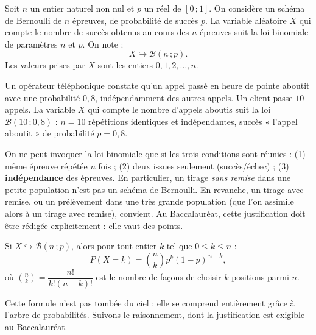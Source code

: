 \documentclass[11pt]{article}
\newcommand{\cle}[1]{{\popxbold\color{popdark}#1}}
\newcounter{popsec}
\newcounter{popsub}
\newcommand{\courssub}[1]{%
  \stepcounter{popsub}%
  \par\vspace{9pt}\noindent{\popxbold\fontsize{11.5}{13}\selectfont\color{popink}{\color{poporange}\thepopsec.\thepopsub}\hspace{6pt}#1}\par\nopagebreak\vspace{4pt}
}
\begin{document}
\begin{definition}
Soit $n$ un entier naturel non nul et $p$ un réel de $[0\,;1]$. On considère un schéma de Bernoulli de $n$ épreuves, de probabilité de succès $p$. La variable aléatoire $X$ qui compte le \cle{nombre de succès} obtenus au cours des $n$ épreuves suit la \cle{loi binomiale} de paramètres $n$ et $p$. On note :
\[ X \hookrightarrow \mathcal{B}(n\,;p). \]
Les valeurs prises par $X$ sont les entiers $0, 1, 2, \dots, n$.
\end{definition}

\begin{exemplebox}
Un opérateur téléphonique constate qu'un appel passé en heure de pointe aboutit avec une probabilité $0{,}8$, indépendamment des autres appels. Un client passe $10$ appels. La variable $X$ qui compte le nombre d'appels aboutis suit la loi $\mathcal{B}(10\,;0{,}8)$ : $n = 10$ répétitions identiques et indépendantes, succès « l'appel aboutit » de probabilité $p = 0{,}8$.
\end{exemplebox}

\begin{attention}
On ne peut invoquer la loi binomiale que si les trois conditions sont réunies : (1) même épreuve répétée $n$ fois ; (2) deux issues seulement (succès/échec) ; (3) \textbf{indépendance} des épreuves. En particulier, un tirage \emph{sans remise} dans une petite population n'est pas un schéma de Bernoulli. En revanche, un tirage avec remise, ou un prélèvement dans une très grande population (que l'on assimile alors à un tirage avec remise), convient. Au Baccalauréat, cette justification doit être rédigée explicitement : elle vaut des points.
\end{attention}

\courssub{Formule de la loi binomiale}

\begin{propriete}
Si $X \hookrightarrow \mathcal{B}(n\,;p)$, alors pour tout entier $k$ tel que $0 \leq k \leq n$ :
\[ P(X = k) = \binom{n}{k} p^k (1-p)^{\,n-k}, \]
où $\binom{n}{k} = \dfrac{n!}{k!(n-k)!}$ est le nombre de façons de choisir $k$ positions parmi $n$.
\end{propriete}

Cette formule n'est pas tombée du ciel : elle se comprend entièrement grâce à l'arbre de probabilités. Suivons le raisonnement, dont la justification est exigible au Baccalauréat.
\end{document}

